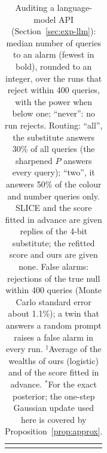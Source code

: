 \begin{table}[t]
\centering
\caption{Auditing a language-model API (Section~\ref{sec:exp-llm}): median
number of queries to an alarm (fewest in bold), rounded to an integer, over
the runs that reject within 400 queries, with the power when below one;
``never'': no run rejects. Routing: ``all'', the substitute answers 30\% of
all queries (the sharpened $P$ answers every query); ``two'', it answers 50\%
of the colour and number queries only. SLICE and the score fitted in advance
are given replies of the 4-bit substitute; the refitted score and ours are
given none. False alarms: rejections of the true null within 400 queries
(Monte Carlo standard error about 1.1\%); a twin that answers a random prompt
raises a false alarm in every run. $^\ddagger$Average of the wealths of ours
(logistic) and of the score fitted in advance. $^*$For the exact posterior;
the one-step Gaussian update used here is covered by
Proposition~\ref{prop:approx}.}
\label{tab:llm}
\small
\setlength{\tabcolsep}{4pt}
\begin{tabular}{@{}c@{}}\resizebox{\textwidth}{!}{\usebox{\widetab}}\end{tabular}
\end{table}

